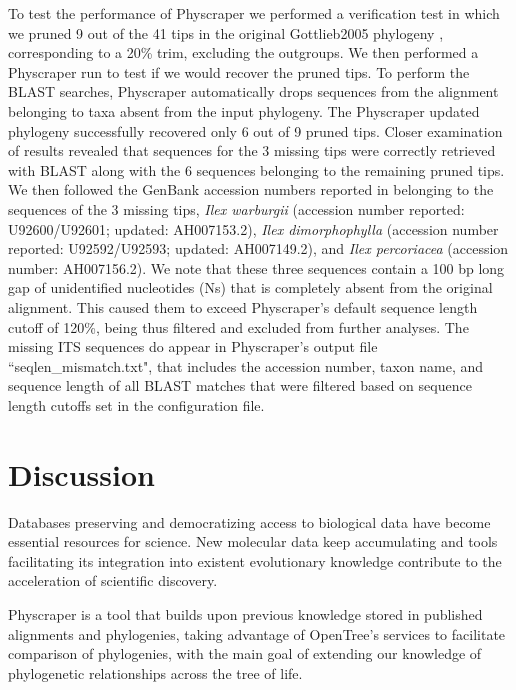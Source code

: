 \documentclass{bmcart}
\providecommand{\DIFdelbegin}{} %
\providecommand{\DIFdelend}{} %
\begin{document}
To test the performance of Physcraper we performed a verification test in which
we pruned 9 out of the 41 tips in the original Gottlieb2005 phylogeny \cite{gottlieb2005molecular},
corresponding to a 20\% trim, excluding the outgroups. We then performed a Physcraper
run to test if we would recover the pruned tips. To perform the BLAST searches,
Physcraper automatically drops sequences from the alignment belonging to taxa
absent from the input phylogeny.
The Physcraper updated phylogeny successfully recovered only 6 out of 9 pruned tips.
Closer examination of results revealed that sequences for the 3 missing tips were correctly retrieved
with BLAST along with the 6 sequences belonging to the remaining pruned tips.
We then followed the GenBank accession numbers reported in \cite{gottlieb2005molecular}
belonging to the sequences of the 3 missing tips, \textit{Ilex warburgii} (accession
number reported: U92600/U92601; updated: AH007153.2), \textit{Ilex dimorphophylla}
(accession number reported: U92592/U92593; updated: AH007149.2),
and \textit{Ilex percoriacea} (accession number: AH007156.2). We note that these three sequences
contain a 100 bp long gap of unidentified nucleotides (Ns) that is completely absent
from the original alignment. This caused them to exceed Physcraper's default sequence
length cutoff of 120\%, being thus filtered and excluded from further analyses.
The missing ITS sequences do appear in Physcraper's output file ``seqlen\_mismatch.txt",
that includes the accession number, taxon name, and sequence length of all BLAST matches
that were filtered based on sequence length cutoffs set in the configuration file.


\section*{Discussion}
Databases preserving and democratizing access to biological data
have become essential resources for science. New molecular data keep accumulating and tools facilitating its integration into
existent evolutionary knowledge contribute to the acceleration of scientific discovery.
\DIFdelbegin %

\DIFdelend Physcraper is a tool that builds upon previous knowledge stored in published
alignments and phylogenies, taking advantage of OpenTree's services to facilitate comparison
of phylogenies, with the main goal of extending our knowledge of phylogenetic relationships
across the tree of life. \DIFdelbegin %
\end{document}
